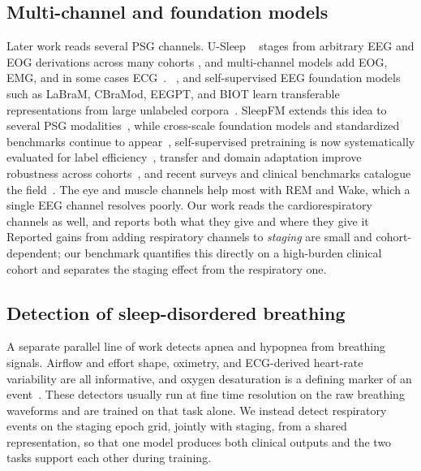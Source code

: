 \documentclass[journal]{IEEEtran}
\providecommand{\DIFaddtex}[1]{{\protect\color{blue} \sf #1}} %
\providecommand{\DIFdeltex}[1]{{\protect\color{red} \scriptsize #1}} %
\providecommand{\DIFaddbegin}{} %
\providecommand{\DIFaddend}{} %
\providecommand{\DIFdelbegin}{} %
\providecommand{\DIFdelend}{} %
\providecommand{\DIFadd}[1]{\texorpdfstring{\DIFaddtex{#1}}{#1}} %
\providecommand{\DIFdel}[1]{\texorpdfstring{\DIFdeltex{#1}}{}} %
\providecommand{\DIFscaledelfig}{0.5}
\newlength{\DIFdelgraphicswidth} %
\newlength{\DIFdelgraphicsheight} %
\providecommand{\DIFaddincludegraphics}[2][]{{\color{blue}\fbox{\DIFOincludegraphics[#1]{#2}}}} %
\providecommand{\DIFdelincludegraphics}[2][]{%
\sbox{\DIFdelgraphicsbox}{\DIFOincludegraphics[#1]{#2}}%
\settoboxwidth{\DIFdelgraphicswidth}{\DIFdelgraphicsbox} %
\settoboxtotalheight{\DIFdelgraphicsheight}{\DIFdelgraphicsbox} %
\scalebox{\DIFscaledelfig}{%
\parbox[b]{\DIFdelgraphicswidth}{\usebox{\DIFdelgraphicsbox}\\[-\baselineskip] \rule{\DIFdelgraphicswidth}{0em}}\llap{\resizebox{\DIFdelgraphicswidth}{\DIFdelgraphicsheight}{%
\setlength{\unitlength}{\DIFdelgraphicswidth}%
\begin{picture}(1,1)%
\thicklines\linethickness{2pt} %
{\color[rgb]{1,0,0}\put(0,0){\framebox(1,1){}}}%
{\color[rgb]{1,0,0}\put(0,0){\line( 1,1){1}}}%
{\color[rgb]{1,0,0}\put(0,1){\line(1,-1){1}}}%
\end{picture}%
}\hspace*{3pt}}} %
} %
\DeclareRobustCommand{\DIFaddbegin}{\DIFOaddbegin \let\includegraphics\DIFaddincludegraphics} %
\DeclareRobustCommand{\DIFaddend}{\DIFOaddend \let\includegraphics\DIFOincludegraphics} %
\DeclareRobustCommand{\DIFdelbegin}{\DIFOdelbegin \let\includegraphics\DIFdelincludegraphics} %
\DeclareRobustCommand{\DIFdelend}{\DIFOaddend \let\includegraphics\DIFOincludegraphics} %
\begin{document}
\subsection{\DIFadd{Multi-channel and foundation models}}
\DIFadd{Later work reads }\DIFaddend several PSG channels. U-Sleep \DIFdelbegin \DIFdel{~\cite{perslev2021usleep} }\DIFdelend stages from arbitrary EEG and EOG derivations
across many cohorts\DIFdelbegin \DIFdel{, and multi-channel models add EOG, EMG, and in some cases
ECG~\cite{phan2021xsleepnet,biot2023,sleepfm2026}. }\DIFdelend \DIFaddbegin \DIFadd{~\cite{perslev2021usleep}, and self-supervised EEG foundation models such
as LaBraM, CBraMod, EEGPT, and BIOT learn transferable representations from large unlabeled
corpora~\cite{labram2024,cbramod2025,eegpt2024,biot2023}. SleepFM extends this idea to several
PSG modalities~\cite{sleepfm2026}, while cross-scale foundation models and standardized
benchmarks continue to appear~\cite{csbrain2025,neuroatlas2026,sleepyland2026}, self-supervised
pretraining is now systematically evaluated for label efficiency~\cite{estevan2025ssl}, transfer
and domain adaptation improve robustness across cohorts~\cite{guillot2023transfer}, and recent
surveys and clinical benchmarks catalogue the field~\cite{yang2026review,hanif2025insomnia}. }\DIFaddend The eye and muscle channels help most with REM and Wake,
which a single EEG channel resolves poorly. \DIFdelbegin \DIFdel{Our work reads the
cardiorespiratory channels as well, and reports both what they give and where they give it}\DIFdelend \DIFaddbegin \DIFadd{Reported gains from adding respiratory channels to
\emph{staging} are small and cohort-dependent; our benchmark quantifies this directly on a
high-burden clinical cohort and separates the staging effect from the respiratory one}\DIFaddend .

\subsection{Detection of sleep-disordered breathing}
A \DIFdelbegin \DIFdel{separate }\DIFdelend \DIFaddbegin \DIFadd{parallel }\DIFaddend line of work detects apnea and hypopnea from breathing signals. Airflow and effort
shape, oximetry, and ECG-derived heart-rate variability are all informative, and oxygen
desaturation is a defining marker of an event~\cite{jing2025cpap}. These detectors usually run
at fine time resolution on the raw breathing waveforms and are trained on that task alone. We
\DIFaddbegin \DIFadd{instead }\DIFaddend detect respiratory events on the staging epoch grid, jointly with staging, from a
shared representation, so that one model produces both clinical outputs and the two tasks
support each other during training.
\end{document}
